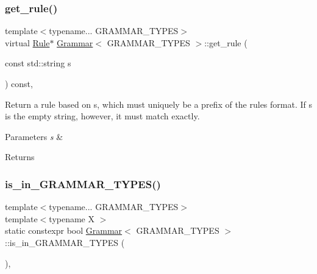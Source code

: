 \subsubsection{\texorpdfstring{get\+\_\+rule()}{get\_rule()}\hspace{0.1cm}{\footnotesize\ttfamily [4/4]}}
{\footnotesize\ttfamily template$<$typename... G\+R\+A\+M\+M\+A\+R\+\_\+\+T\+Y\+P\+ES$>$ \\
virtual \hyperlink{class_rule}{Rule}$\ast$ \hyperlink{class_grammar}{Grammar}$<$ G\+R\+A\+M\+M\+A\+R\+\_\+\+T\+Y\+P\+ES $>$\+::get\+\_\+rule (\begin{DoxyParamCaption}\item[{const std\+::string}]{s }\end{DoxyParamCaption}) const\hspace{0.3cm}{\ttfamily [inline]}, {\ttfamily [virtual]}}

Return a rule based on s, which must uniquely be a prefix of the rule\textquotesingle{}s format. If s is the empty string, however, it must match exactly. 
\begin{DoxyParams}{Parameters}
{\em s} & \\
\hline
\end{DoxyParams}
\begin{DoxyReturn}{Returns}

\end{DoxyReturn}
\mbox{\label{class_grammar_a9ec7418e0263e2ade2340e248c04275d}} 
\subsubsection{\texorpdfstring{is\+\_\+in\+\_\+\+G\+R\+A\+M\+M\+A\+R\+\_\+\+T\+Y\+P\+E\+S()}{is\_in\_GRAMMAR\_TYPES()}}
{\footnotesize\ttfamily template$<$typename... G\+R\+A\+M\+M\+A\+R\+\_\+\+T\+Y\+P\+ES$>$ \\
template$<$typename X $>$ \\
static constexpr bool \hyperlink{class_grammar}{Grammar}$<$ G\+R\+A\+M\+M\+A\+R\+\_\+\+T\+Y\+P\+ES $>$\+::is\+\_\+in\+\_\+\+G\+R\+A\+M\+M\+A\+R\+\_\+\+T\+Y\+P\+ES (\begin{DoxyParamCaption}{ }\end{DoxyParamCaption})\hspace{0.3cm}{\ttfamily [inline]}, {\ttfamily [static]}}

